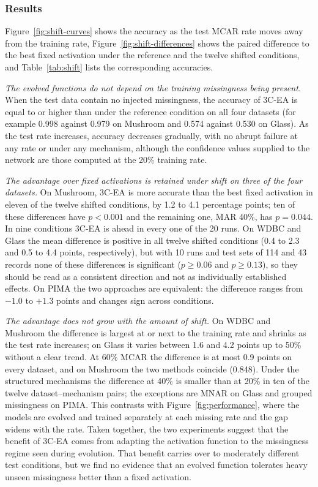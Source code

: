 \subsubsection{Results}
Figure~\ref{fig:shift-curves} shows the accuracy as the test MCAR rate moves away from the training rate,
Figure~\ref{fig:shift-differences} shows the paired difference to the best fixed activation under the reference and
the twelve shifted conditions, and Table~\ref{tab:shift} lists the corresponding accuracies.

\emph{The evolved functions do not depend on the training missingness being present.} When the test data contain no
injected missingness, the accuracy of 3C-EA is equal to or higher than under the reference condition on all four
datasets (for example 0.998 against 0.979 on Mushroom and 0.574 against 0.530 on Glass). As the test rate increases,
accuracy decreases gradually, with no abrupt failure at any rate or under any mechanism, although the confidence values
supplied to the network are those computed at the 20\% training rate.

\emph{The advantage over fixed activations is retained under shift on three of the four datasets.} On Mushroom, 3C-EA
is more accurate than the best fixed activation in eleven of the twelve shifted conditions, by 1.2 to 4.1 percentage
points; ten of these differences have $p<0.001$ and the remaining one, MAR 40\%, has $p=0.044$. In nine conditions
3C-EA is ahead in every one of the 20 runs. On WDBC and Glass the mean difference is positive in all twelve shifted
conditions (0.4 to 2.3 and 0.5 to 4.4 points, respectively), but with 10 runs and test sets of 114 and 43 records none
of these differences is significant ($p\ge 0.06$ and $p\ge 0.13$), so they should be read as a consistent direction
and not as individually established effects. On PIMA the two approaches are equivalent: the difference ranges from $-1.0$ to
$+1.3$ points and changes sign across conditions.

\emph{The advantage does not grow with the amount of shift.} On WDBC and Mushroom the difference is largest at or next
to the training rate and shrinks as the test rate increases; on Glass it varies between 1.6 and 4.2 points up to 50\%
without a clear trend. At 60\% MCAR the difference is at most 0.9 points on every dataset, and on Mushroom the two
methods coincide (0.848). Under the structured mechanisms the difference at 40\% is smaller than at 20\% in ten of the
twelve dataset--mechanism pairs; the exceptions are MNAR on Glass and grouped missingness on PIMA. This contrasts with
Figure~\ref{fig:performance}, where the models are evolved and trained separately at each missing rate and the gap
widens with the rate. Taken together, the two experiments suggest that the benefit of 3C-EA comes from adapting the
activation function to the missingness regime seen during evolution. That benefit carries over to moderately different
test conditions, but we find no evidence that an evolved function tolerates heavy unseen missingness better than a
fixed activation.

